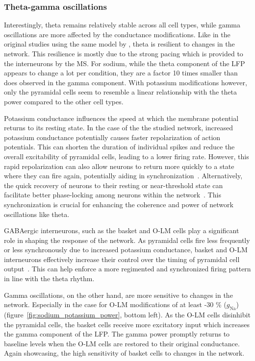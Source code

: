 \subsubsection{Theta-gamma oscillations}
Interestingly, theta remains relatively stable across all cell types, while gamma oscillations are more affected by the conductance modifications.
Like in the original studies using the same model by \textcite{sanjayImpairedDendriticInhibition2015,neymotinKetamineDisruptsTheta2011},
theta is resilient to changes in the network. This resilience is mostly due to the strong pacing which is provided to the interneurons by the MS\@.
For sodium, while the theta component of the LFP appears to change a lot per condition, they are a factor 10 times smaller than does observed in the gamma component.
With potassium modifications however, only the pyramidal cells seem to resemble a linear relationship with the theta power compared to the other cell types.

Potassium conductance influences the speed at which the membrane potential returns to its resting state.
In the case of the the studied network, increased potassium conductance potentially causes faster repolarization of action potentials.
This can shorten the duration of individual spikes and reduce the overall excitability of pyramidal cells, leading to a lower firing rate.
However, this rapid repolarization can also allow neurons to return more quickly to a state where they can fire again, potentially aiding in
synchronization~\parencite{mysinMechanismsFunctionsRole2022}.
Alternatively, the quick recovery of neurons to their resting or near-threshold state can facilitate better phase-locking among neurons within
the network~\parencite{leungPhasicModulationHippocampal2020a}. This synchronization is crucial for enhancing the coherence and power of network
oscillations like theta.

GABAergic interneurons, such as the basket and O-LM cells play a significant role in shaping the response of the network.
As pyramidal cells fire less frequently or less synchronously due to increased potassium conductance,
basket and O-LM interneurons effectively increase their control over the timing of pyramidal cell output~\parencite{unalSpatiotemporalSpecializationGABAergic2018}.
This can help enforce a more regimented and synchronized firing pattern in line with the theta rhythm.

Gamma oscillations, on the other hand, are more sensitive to changes in the network. Especially in the case for O-LM modifications of at least -30 \% (\(g_{\text{Na}}\))
(figure~\ref{fig:sodium_potassium_power}, bottom left). As the O-LM cells disinhibit the pyramidal cells, the basket cells receive more excitatory input which
increases the gamma component of the LFP\@. The gamma power promptly returns to baseline levels when the O-LM cells are restored to their original conductance.
Again showcasing, the high sensitivity of basket cells to changes in the network.

